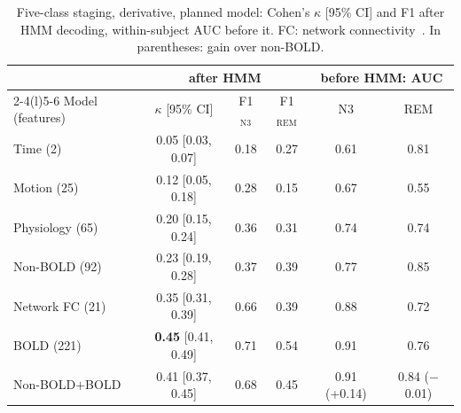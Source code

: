 \begin{table}[t]
\centering
\fontsize{7.5}{9}\selectfont
\setlength{\tabcolsep}{1.3pt}
\caption{Five-class staging, derivative, planned model: Cohen's $\kappa$ [95\% CI] and F1 after HMM decoding, within-subject AUC before it. FC: network connectivity~\cite{tagliazucchi2012}. In parentheses: gain over non-BOLD.}
\label{tab:ladder}
\begin{tabular}{@{}lccccc@{}}
\toprule
 & \multicolumn{3}{c}{after HMM} & \multicolumn{2}{c}{before HMM: AUC} \\
\cmidrule(lr){2-4}\cmidrule(l){5-6}
Model (features) & $\kappa$ [95\% CI] & F1$_\mathrm{N3}$ & F1$_\mathrm{REM}$ & N3 & REM \\
\midrule
Time (2) & 0.05 [0.03, 0.07] & 0.18 & 0.27 & 0.61 & 0.81 \\
Motion (25) & 0.12 [0.05, 0.18] & 0.28 & 0.15 & 0.67 & 0.55 \\
Physiology (65) & 0.20 [0.15, 0.24] & 0.36 & 0.31 & 0.74 & 0.74 \\
Non-BOLD (92) & 0.23 [0.19, 0.28] & 0.37 & 0.39 & 0.77 & 0.85 \\
\midrule
Network FC (21) & 0.35 [0.31, 0.39] & 0.66 & 0.39 & 0.88 & 0.72 \\
BOLD (221) & \textbf{0.45} [0.41, 0.49] & 0.71 & 0.54 & 0.91 & 0.76 \\
\midrule
Non-BOLD$+$BOLD & 0.41 [0.37, 0.45] & 0.68 & 0.45 & 0.91 (+0.14) & 0.84 ($-$0.01) \\
\bottomrule
\end{tabular}
\end{table}

